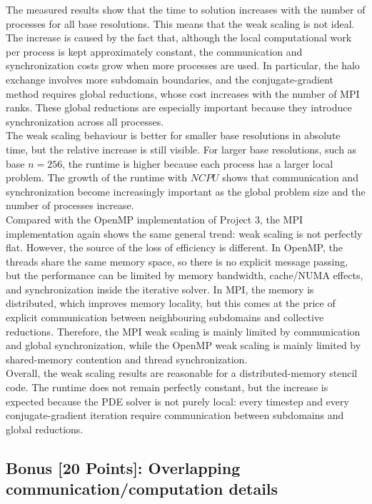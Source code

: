 \documentclass[unicode,10pt,a4paper,oneside,numbers=endperiod,openany]{scrartcl}
\begin{document}
The measured results show that the time to solution increases with the number of processes for all base resolutions. This means that the weak scaling is not ideal. The increase is caused by the fact that, although the local computational work per process is kept approximately constant, the communication and synchronization costs grow when more processes are used. In particular, the halo exchange involves more subdomain boundaries, and the conjugate-gradient method requires global reductions, whose cost increases with the number of MPI ranks. These global reductions are especially important because they introduce synchronization across all processes.\\

The weak scaling behaviour is better for smaller base resolutions in absolute time, but the relative increase is still visible. For larger base resolutions, such as base $n=256$, the runtime is higher because each process has a larger local problem. The growth of the runtime with $NCPU$ shows that communication and synchronization become increasingly important as the global problem size and the number of processes increase.\\

Compared with the OpenMP implementation of Project 3, the MPI implementation again shows the same general trend: weak scaling is not perfectly flat. However, the source of the loss of efficiency is different. In OpenMP, the threads share the same memory space, so there is no explicit message passing, but the performance can be limited by memory bandwidth, cache/NUMA effects, and synchronization inside the iterative solver. In MPI, the memory is distributed, which improves memory locality, but this comes at the price of explicit communication between neighbouring subdomains and collective reductions. Therefore, the MPI weak scaling is mainly limited by communication and global synchronization, while the OpenMP weak scaling is mainly limited by shared-memory contention and thread synchronization.\\

Overall, the weak scaling results are reasonable for a distributed-memory stencil code. The runtime does not remain perfectly constant, but the increase is expected because the PDE solver is not purely local: every timestep and every conjugate-gradient iteration require communication between subdomains and global reductions.
\subsection{Bonus [20 Points]: Overlapping communication/computation details}
\end{document}
